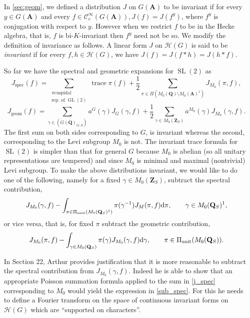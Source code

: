 \documentclass[11pt]{amsart}
\def\A{\mathbf A}
\def\Q{\mathbf Q}
\def\Z{\mathbf Z}
\def\CCC{\mathcal C}
\def\HHH{\mathcal H}
\def\d{\text d}
\def\bs{\setminus}
\def\gl{\operatorname{GL}}
\def\sl{\operatorname{SL}}
\def\trace{\operatorname{trace}}
\theoremstyle{remark}
\begin{document}
In \cref{sec:geom}, we defined a distribution $J$ on $G(\A)$ to be invariant if for every $y \in G(\A)$ and every $f \in \CCC_c^\infty(G(\A)), J(f) = J(f^y)$, where $f^y$ is conjugation with respect to $y$. However when we restrict $f$ to be in the Hecke algebra, that is, $f$ is bi-$K$-invariant then $f^y$ need not be so. We modify the definition of invariance as follows. A linear form $J$ on $\HHH(G)$ is said to be \textit{invariant} if for every $f, h \in \HHH(G)$, we have $J(f) = J(f*h) = J(h*f)$.

So far we have the spectral and geometric expansions for $\sl(2)$ as
\begin{equation} \label{j_spec}
	J_{\text{spec}}(f) = \sum_{\substack{\pi \text{cuspidal} \\ \text{rep. of } \gl(2)}} \trace \pi(f) + \frac{1}{2} \sum_{\pi \in \Pi(M_0(\Q) \bs M_0(\A)^1)} J_{M_0}(\pi, f), 
\end{equation}
\begin{equation} \label{j_geom}
	J_{\text{geom}}(f) = \sum_{\gamma \in (G(\Q)_{G, S})} a^G(\gamma) J_G(\gamma, f) + \frac{1}{2} \sum_{\gamma \in M_0(\Z_S)} a^{M_0}(\gamma) J_{M_0}(\gamma, f). 
\end{equation}
The first sum on both sides corresponding to $G$, is invariant whereas the second, corresponding to the Levi subgroup $M_0$ is not. The invariant trace formula for $\sl(2)$ is simpler than that for general $G$ because $M_0$ is abelian (so all unitary representations are tempered) and since $M_0$ is minimal and maximal (nontrivial) Levi subgroup. To make the above distributions invariant, we would like to do one of the following, namely for a fixed $\gamma \in M_0(\Z_S)$, subtract the spectral contribution, 
\begin{equation} \label{sub_spec}
J_{M_0}(\gamma, f) - \int_{\pi \in \Pi_{\text{unit}}(M_0(\Q_S)^1)} \pi(\gamma^{-1}) J_M(\pi, f) \d \pi, \qquad \gamma \in M_0(\Q_S)^1,
\end{equation}
or vice versa, that is, for fixed $\pi$ subtract the geometric contribution,
\[ J_{M_0}(\pi, f) - \int_{\gamma \in M_0(\Q_S)} \pi(\gamma) J_{M_0}(\gamma, f) \d \gamma, \qquad \pi \in \Pi_{\text{unit}}(M_0(\Q_S)). \]

In Section 22, Arthur provides justification that it is more reasonable to subtract the spectral contribution from $J_{M_0}(\gamma, f)$. Indeed he is able to show that an appropriate Poisson summation formula applied to the sum in \cref{j_spec} corresponding to $M_0$ would yield the expression in \cref{sub_spec}. For this he needs to define a Fourier transform on the space of continuous invariant forms on $\HHH(G)$ which are ``supported on characters''. 
\end{document}
